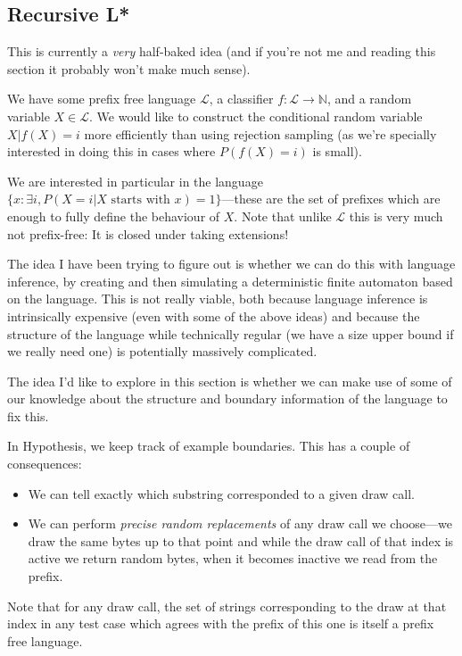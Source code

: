 \documentclass[a4paper]{book}
\begin{document}
\subsection{Recursive L*}

This is currently a \emph{very} half-baked idea (and if you're not me and reading this section it probably won't make much sense).

We have some prefix free language \(\mathcal{L}\), a classifier \(f: \mathcal{L} \to \mathbb{N}\),
and a random variable \(X \in \mathcal{L}\).
We would like to construct the conditional random variable \(X|f(X) = i\) more efficiently than using rejection sampling
(as we're specially interested in doing this in cases where \(P(f(X) = i)\) is small).

We are interested in particular in the language \(\{x: \exists i, P(X = i|X \text{ starts with } x) = 1\}\)---these
are the set of prefixes which are enough to fully define the behaviour of \(X\).
Note that unlike \(\mathcal{L}\) this is very much not prefix-free:
It is closed under taking extensions!

The idea I have been trying to figure out is whether we can do this with language inference,
by creating and then simulating a deterministic finite automaton based on the language.
This is not really viable,
both because language inference is intrinsically expensive (even with some of the above ideas) and because the structure of the language while technically regular (we have a size upper bound if we really need one) is potentially massively complicated.

The idea I'd like to explore in this section is whether we can make use of some of our knowledge about the structure and boundary information of the language to fix this.

In Hypothesis,
we keep track of example boundaries.
This has a couple of consequences:

\begin{itemize}
\item We can tell exactly which substring corresponded to a given draw call.
\item We can perform \emph{precise random replacements} of any draw call we choose---we
draw the same bytes up to that point and while the draw call of that index is active we return random bytes,
when it becomes inactive we read from the prefix.
\end{itemize}

Note that for any draw call,
the set of strings corresponding to the draw at that index in any test case which agrees with the prefix of this one is itself a prefix free language.
\end{document}
